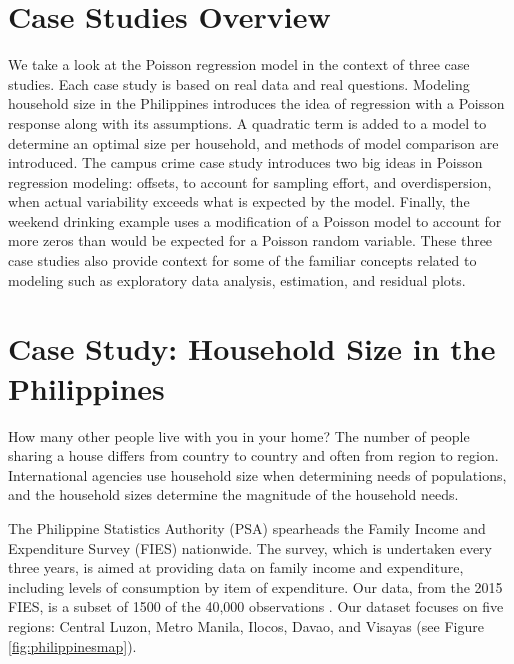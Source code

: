 \documentclass[
]{krantz}
\begin{document}
\hypertarget{case-studies-overview}{%
\section{Case Studies Overview}\label{case-studies-overview}}

We take a look at the Poisson regression model in the context of three case studies. Each case study is based on real data and real questions. Modeling household size in the Philippines introduces the idea of regression with a Poisson response along with its assumptions. A quadratic term is added to a model to determine an optimal size per household, and methods of model comparison are introduced. The campus crime case study introduces two big ideas in Poisson regression modeling: offsets, to account for sampling effort, and overdispersion, when actual variability exceeds what is expected by the model. Finally, the weekend drinking example uses a modification of a Poisson model to account for more zeros than would be expected for a Poisson random variable. These three case studies also provide context for some of the familiar concepts related to modeling such as exploratory data analysis, estimation, and residual plots.

\hypertarget{cs-philippines}{%
\section{Case Study: Household Size in the Philippines}\label{cs-philippines}}

How many other people live with you in your home? The number of people sharing a house differs from country to country and often from region to region. International agencies use household size when determining needs of populations, and the household sizes determine the magnitude of the household needs.

The Philippine Statistics Authority (PSA) spearheads the Family Income and Expenditure Survey (FIES) nationwide. The survey, which is undertaken every three years, is aimed at providing data on family income and expenditure, including levels of consumption by item of expenditure. Our data, from the 2015 FIES, is a subset of 1500 of the 40,000 observations \citep{PSA}. Our dataset focuses on five regions: Central Luzon, Metro Manila, Ilocos, Davao, and Visayas (see Figure \ref{fig:philippinesmap}).
\end{document}
